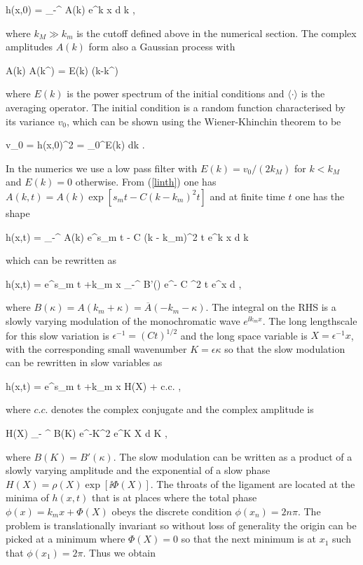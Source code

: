 \be
h(x,0) = \int_{-\infty}^{\infty}  A(k) e^{\ii k x} {\textrm{d}} k , 
\nd

where $k_M \gg k_m$ is the cutoff defined above in the numerical section. 
The complex amplitudes $A(k)$ form also a Gaussian process \cite{monin1971statistical} with

\be
\langle A(k) \overline A(k^\prime) \rangle =  E(k) \delta(k-k^\prime)
\nd

where $E(k)$ is the power spectrum of the initial conditions and
$\langle \cdot \rangle$ is the averaging operator. 
The initial condition is a random function characterised by its variance 
$v_0$, which can be shown using the Wiener-Khinchin theorem to be 

\be
v_0 = \langle h(x,0)^2 \rangle = \int_0^\infty E(k) {\textrm{d}}k . 
\nd

In the numerics we use a low pass filter
with $E(k)= v_0/(2k_M)$ for $k<k_M$ and $E(k)=0$ otherwise. 
From (\ref{linth}) one has $A(k,t) = A(k) \exp[ s_m t -  C (k - k_m)^2 t]$ and 
at finite time $t$ one has the shape

\be
h(x,t) = \int_{-\infty}^{\infty}  A(k) e^{s_m t -  C (k - k_m)^2 t}  e^{\ii k x} {\textrm{d}} k
\nd

which can be rewritten as 

\be
h(x,t) =  e^{s_m t +\ii k_m x} \int_{-\infty}^{\infty}  B'(\kappa) e^{-  C \kappa^2 t}  e^{\ii \kappa x} {\textrm{d}} \kappa ,
\nd

where $B(\kappa) = A(k_m + \kappa) = \overline A(-k_m -\kappa)$.
The integral on the RHS is a slowly varying modulation of the monochromatic wave $e^{\ii k_m x}$. 
The long lengthscale for this slow variation is $\epsilon^{-1} = (C t)^{1/2}$ and 
the long space variable is $X = \epsilon^{-1} x$, with the corresponding small 
wavenumber $K = \epsilon \kappa$ so that the slow modulation can be rewritten in slow variables as

\be
h(x,t) =   e^{s_m t +\ii k_m x} H(X)  + c.c. \label{slowamp} , 
\nd

where $c.c.$ denotes the complex conjugate and the complex amplitude is

\be
H(X) \simeq \int_{- \infty}^{\infty}  B(K) e^{-K^2}  e^{\ii K X} {\textrm{d}} K \label{saddle} , 
\nd

where $B(K) = B'(\kappa)$. 
The slow modulation can be written as a product of a slowly varying amplitude 
and the exponential of a slow phase $H(X) = \rho(X) \exp [{ \ii \Phi(X) }]$. 
The throats of the  ligament are located at the minima of
$h(x,t)$ that is at places where the total phase
$\phi(x) =  k_m x + \Phi ( X) $ obeys the discrete condition $ \phi(x_n) = 2 n \pi $.
The problem is translationally invariant so without loss of generality the origin can be picked
at a minimum where $\Phi(X) = 0$ so that the next minimum is at $x_1$ such that  $\phi(x_1)= 2 \pi$.
Thus we obtain 

